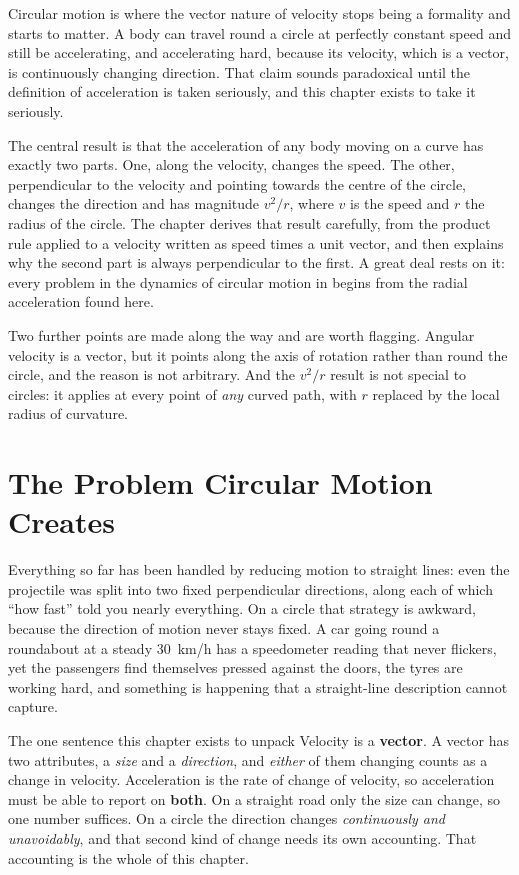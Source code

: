 
Circular motion is where the vector nature of velocity stops being a formality and starts to matter. A
body can travel round a circle at perfectly constant speed and still be accelerating, and accelerating
hard, because its velocity, which is a vector, is continuously changing direction. That claim sounds
paradoxical until the definition of acceleration is taken seriously, and this chapter exists to take it
seriously.

The central result is that the acceleration of any body moving on a curve has exactly two parts. One,
along the velocity, changes the speed. The other, perpendicular to the velocity and pointing towards the
centre of the circle, changes the direction and has magnitude $v^2/r$, where $v$ is the speed and $r$ the radius of the circle. The chapter derives that result
carefully, from the product rule applied to a velocity written as speed times a unit vector, and then
explains why the second part is always perpendicular to the first. A great deal rests on it: every
problem in the dynamics of circular motion in  begins from the radial acceleration found here.

Two further points are made along the way and are worth flagging. Angular velocity is a vector, but it
points along the axis of rotation rather than round the circle, and the reason is not arbitrary. And the
$v^2/r$ result is not special to circles: it applies at every point of \emph{any} curved path, with $r$
replaced by the local radius of curvature.

\section{The Problem Circular Motion Creates}

Everything so far has been handled by reducing motion to straight lines: even the projectile was split
into two fixed perpendicular directions, along each of which ``how fast'' told you nearly everything. On a
circle that strategy is awkward, because the direction of motion never stays fixed. A car going round a roundabout at a steady \SI{30}{km/h} has a
speedometer reading that never flickers, yet the passengers find themselves pressed against the doors,
the tyres are working hard, and something is happening that a straight-line description cannot capture.

\begin{motivbox}{The one sentence this chapter exists to unpack}
Velocity is a \textbf{vector}. A vector has two attributes, a \emph{size} and a \emph{direction},
and \emph{either} of them changing counts as a change in velocity. Acceleration is the rate of change of
velocity, so acceleration must be able to report on \textbf{both}. On a straight road only the size can
change, so one number suffices. On a circle the direction changes \emph{continuously and unavoidably},
and that second kind of change needs its own accounting. That accounting is the whole of this chapter.
\end{motivbox}

